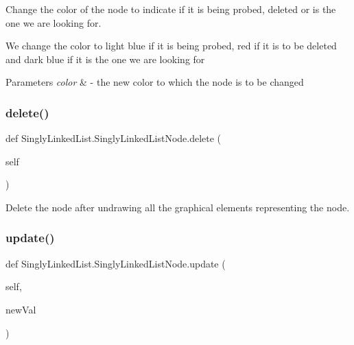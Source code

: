 Change the color of the node to indicate if it is being probed, deleted or is the one we are looking for. 

We change the color to light blue if it is being probed, red if it is to be deleted and dark blue if it is the one we are looking for 
\begin{DoxyParams}{Parameters}
{\em color} & -\/ the new color to which the node is to be changed \\
\hline
\end{DoxyParams}
\mbox{\label{class_singly_linked_list_1_1_singly_linked_list_node_a0acea59e6b0d5b52205ebdedcba44d31}} 
\subsubsection{\texorpdfstring{delete()}{delete()}}
{\footnotesize\ttfamily def Singly\+Linked\+List.\+Singly\+Linked\+List\+Node.\+delete (\begin{DoxyParamCaption}\item[{}]{self }\end{DoxyParamCaption})}



Delete the node after undrawing all the graphical elements representing the node. 

\mbox{\label{class_singly_linked_list_1_1_singly_linked_list_node_aa68f8ef3332faaa7d105f0ee6a26537f}} 
\subsubsection{\texorpdfstring{update()}{update()}}
{\footnotesize\ttfamily def Singly\+Linked\+List.\+Singly\+Linked\+List\+Node.\+update (\begin{DoxyParamCaption}\item[{}]{self,  }\item[{}]{new\+Val }\end{DoxyParamCaption})}



